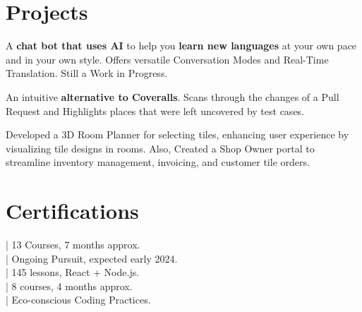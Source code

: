 \documentclass[]{deedy-resume-openfont}
\begin{document}
\begin{minipage}[t]{0.66\textwidth}
\begin{tightemize}
\end{tightemize}
\sectionsep

\section{Projects}
A \textbf{chat bot that uses AI} to help you \textbf{learn new languages} at your own pace and in your own style. Offers versatile Conversation Modes and Real-Time Translation. Still a Work in Progress.
\sectionsep

An intuitive \textbf{alternative to Coveralls}. Scans through the changes of a Pull Request and Highlights places that were left uncovered by test cases.
\sectionsep

Developed a 3D Room Planner for selecting tiles, enhancing user experience by visualizing tile designs in rooms. Also, Created a Shop Owner portal to streamline inventory management, invoicing, and customer tile orders.
\sectionsep

\vspace{3pt}
\section{Certifications} 
| 13 Courses, 7 months approx.\\
\vspace{4pt}
| Ongoing Pursuit, expected early 2024.\\
\vspace{4pt}
| 145 lessons, React + Node.js.\\
\vspace{4pt}
| 8 courses, 4 months approx.\\
\vspace{4pt}
| Eco-conscious Coding Practices.\\
\sectionsep

\end{minipage} 
\end{document}

